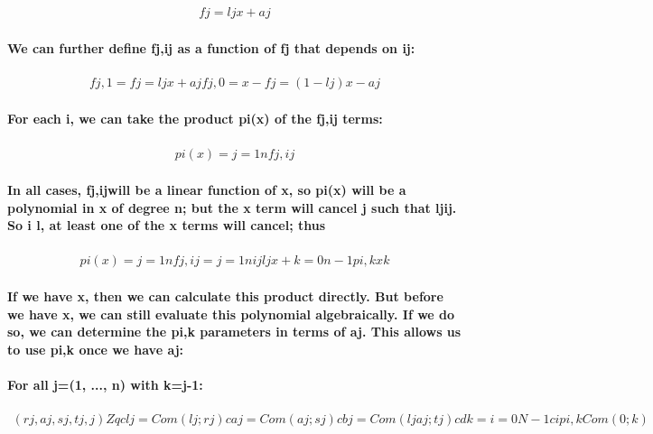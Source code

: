 \documentclass{article}
\begin{document}
\begin{eqnarray}
  fj=ljx+aj
\end{eqnarray}

\paragraph{We can further define fj,ij as a function of fj that depends on ij:}

\begin{eqnarray}
  fj,1=fj=ljx+aj
  fj,0=x-fj=(1-lj) x -aj
\end{eqnarray}

\paragraph{For each i, we can take the product pi(x) of the fj,ij terms:}

\begin{eqnarray}
  pi(x)=j=1nfj,ij
\end{eqnarray}

\paragraph{In all cases, fj,ijwill be a linear function of x, so pi(x) will be a polynomial in x  of degree n; but the x term will cancel  j such that ljij.  So  i l, at least one of the x terms will cancel; thus}

\begin{eqnarray}
  pi(x)=j=1nfj,ij=j=1nijljx+ k=0n-1pi,k xk
\end{eqnarray}

\paragraph{If we have x, then we can calculate this product directly.  But before we have x, we can still evaluate this polynomial algebraically.  If we do so, we can determine the pi,k parameters in terms of aj.  This allows us to use pi,k once we have aj:}

\paragraph{For all j=(1, ..., n) with k=j-1:}

\begin{eqnarray}
  (rj,aj,sj,tj,j) Zq
  clj=Com(lj;rj)
  caj=Com(aj;sj)
  cbj=Com(ljaj;tj)
  cdk=i=0N-1cipi,k Com(0;k)
\end{eqnarray}
\end{document}
